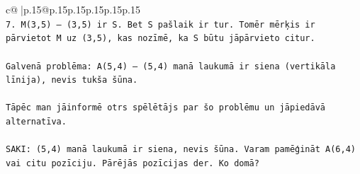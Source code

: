 \documentclass{article}
\begin{document}
{\begin{supertabular}{c@{$\;$}|p{.15\linewidth}@{}p{.15\linewidth}p{.15\linewidth}p{.15\linewidth}p{.15\linewidth}p{.15\linewidth}}
{{{\\ 
\texttt{7. M(3,5) — (3,5) ir S. Bet S pašlaik ir tur. Tomēr mērķis ir pārvietot M uz (3,5), kas nozīmē, ka S būtu jāpārvieto citur.} \\
\\ 
\texttt{Galvenā problēma: A(5,4) — (5,4) manā laukumā ir siena (vertikāla līnija), nevis tukša šūna.} \\
\\ 
\texttt{Tāpēc man jāinformē otrs spēlētājs par šo problēmu un jāpiedāvā alternatīva.} \\
\\ 
\texttt{SAKI: (5,4) manā laukumā ir siena, nevis šūna. Varam pamēģināt A(6,4) vai citu pozīciju. Pārējās pozīcijas der. Ko domā?} \\
            }
        }
    }
     \\ \\


\end{supertabular}}
\end{document}
